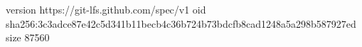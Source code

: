 version https://git-lfs.github.com/spec/v1
oid sha256:3c3adce87e42c5d341b11becb4c36b724b73bdcfb8cad1248a5a298b587927ed
size 87560
